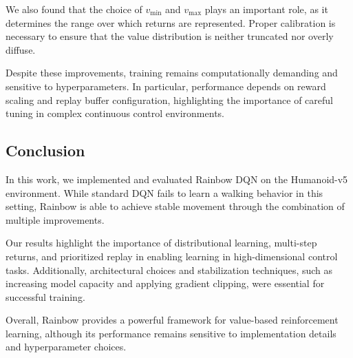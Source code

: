 We also found that the choice of $v_{\min}$ and $v_{\max}$ plays an important role, as it determines the range over which returns are represented. Proper calibration is necessary to ensure that the value distribution is neither truncated nor overly diffuse.

Despite these improvements, training remains computationally demanding and sensitive to hyperparameters. In particular, performance depends on reward scaling and replay buffer configuration, highlighting the importance of careful tuning in complex continuous control environments.

\subsection{Conclusion}

In this work, we implemented and evaluated Rainbow DQN on the Humanoid-v5 environment. While standard DQN fails to learn a walking behavior in this setting, Rainbow is able to achieve stable movement through the combination of multiple improvements.

Our results highlight the importance of distributional learning, multi-step returns, and prioritized replay in enabling learning in high-dimensional control tasks. Additionally, architectural choices and stabilization techniques, such as increasing model capacity and applying gradient clipping, were essential for successful training.

Overall, Rainbow provides a powerful framework for value-based reinforcement learning, although its performance remains sensitive to implementation details and hyperparameter choices.
